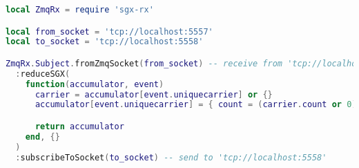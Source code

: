 \begin{lstlisting}[language=LUA,caption={Process pipeline with Zmq-RxLua using SGX: reducer.},label=rx-processing-sgx-reduce-events]
local ZmqRx = require 'sgx-rx'

local from_socket = 'tcp://localhost:5557'
local to_socket = 'tcp://localhost:5558'

ZmqRx.Subject.fromZmqSocket(from_socket) -- receive from 'tcp://localhost:5557'
  :reduceSGX(
    function(accumulator, event)
      carrier = accumulator[event.uniquecarrier] or {}
      accumulator[event.uniquecarrier] = { count = (carrier.count or 0) + 1, total = (carrier.total or 0) + event.arrdelay }

      return accumulator
    end, {}
  )
  :subscribeToSocket(to_socket) -- send to 'tcp://localhost:5558'
\end{lstlisting}
